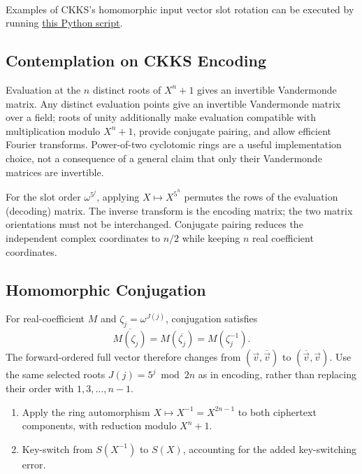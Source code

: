 $ $


 Examples of CKKS's homomorphic input vector slot rotation can be executed by running \href{https://github.com/wang2000star/fhe-textbook-cn/blob/chinese-edition/source%20code/ckks.py}{\underline{this Python script}}.





\subsection{Contemplation on CKKS Encoding}
\label{subsec:ckks-encoding-contemplate}

 Evaluation at the $n$ distinct roots of $X^n+1$ gives an invertible Vandermonde matrix. Any distinct evaluation points give an invertible Vandermonde matrix over a field; roots of unity additionally make evaluation compatible with multiplication modulo $X^n+1$, provide conjugate pairing, and allow efficient Fourier transforms. Power-of-two cyclotomic rings are a useful implementation choice, not a consequence of a general claim that only their Vandermonde matrices are invertible.

For the slot order $\omega^{5^j}$, applying $X\mapsto X^{5^h}$ permutes the rows of the evaluation (decoding) matrix. The inverse transform is the encoding matrix; the two matrix orientations must not be interchanged. Conjugate pairing reduces the independent complex coordinates to $n/2$ while keeping $n$ real coefficient coordinates.


\subsection{Homomorphic Conjugation}
\label{subsec:ckks-conjugation}

For real-coefficient $M$ and $\zeta_j=\omega^{J(j)}$, conjugation satisfies
\[
\overline{M(\zeta_j)}=M(\overline{\zeta_j})=M(\zeta_j^{-1}).
\]
The forward-ordered full vector therefore changes from $(\vec v,\overline{\vec v})$ to $(\overline{\vec v},\vec v)$. Use the same selected roots $J(j)=5^j\bmod 2n$ as in encoding, rather than replacing their order with $1,3,\ldots,n-1$.

\begin{tcolorbox}[title={\textbf{\tboxlabel{\ref*{subsec:ckks-conjugation}} CKKS Homomorphic Conjugation}}]
\begin{enumerate}
\item Apply the ring automorphism $X\mapsto X^{-1}=X^{2n-1}$ to both ciphertext components, with reduction modulo $X^n+1$.
\item Key-switch from $S(X^{-1})$ to $S(X)$, accounting for the added key-switching error.
\end{enumerate}
\end{tcolorbox}

